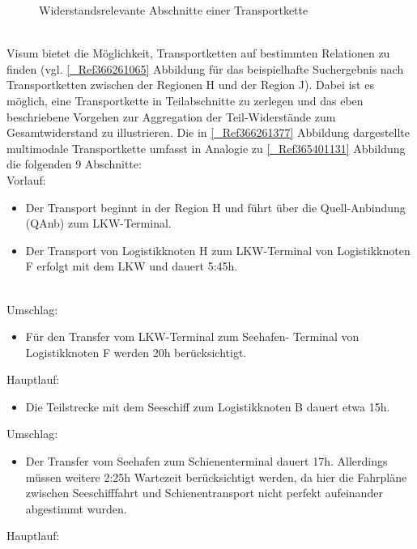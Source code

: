 \begin{figure}[htbp]
  \centering
  \caption{ Widerstandsrelevante Abschnitte einer Transportkette}
  \label{_Ref365401131}
\end{figure}
~\\
Visum bietet die Möglichkeit, Transportketten auf bestimmten Relationen zu finden (vgl. \autoref{_Ref366261065} Abbildung  für das beispielhafte Suchergebnis nach Transportketten zwischen der Regionen H und der Region J). Dabei ist es möglich, eine Transportkette in Teilabschnitte zu zerlegen und das eben beschriebene Vorgehen zur Aggregation der Teil-Widerstände zum Gesamtwiderstand zu illustrieren. Die in \autoref{_Ref366261377} Abbildung  dargestellte multimodale Transportkette umfasst in Analogie zu \autoref{_Ref365401131} Abbildung  die folgenden 9 Abschnitte:~\\
Vorlauf:~\\

\begin{itemize}
%
   \item Der Transport beginnt in der Region H und führt über die Quell-Anbindung (QAnb) zum LKW-Terminal.
   \item Der Transport von Logistikknoten H zum LKW-Terminal von Logistikknoten F erfolgt mit dem LKW  und dauert 5:45h. 
%
\end{itemize}
~\\
Umschlag:~\\

\begin{itemize}
%
   \item Für den Transfer vom LKW-Terminal zum Seehafen- Terminal von Logistikknoten F werden 20h berücksichtigt.
%
\end{itemize}
Hauptlauf:~\\

\begin{itemize}
%
   \item Die Teilstrecke mit dem Seeschiff zum Logistikknoten B dauert etwa 15h. 
%
\end{itemize}
Umschlag:~\\

\begin{itemize}
%
   \item Der Transfer vom Seehafen zum Schienenterminal dauert 17h. Allerdings müssen weitere 2:25h Wartezeit berücksichtigt werden, da hier die Fahrpläne zwischen Seeschifffahrt und Schienentransport nicht perfekt aufeinander abgestimmt wurden.
%
\end{itemize}
Hauptlauf:~\\

